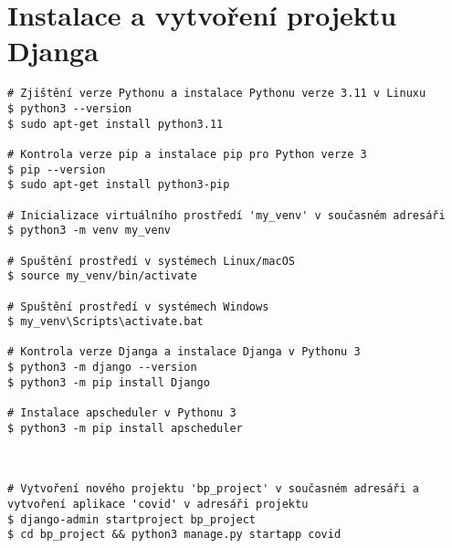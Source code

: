 \chapter{Instalace a vytvoření projektu Djanga}

\begin{lstlisting}[style=bash,label=src:DjangoInstall,caption={Instalace a vytvoření projektu Djanga \cite{django-dokumentace}}]
# Zjištění verze Pythonu a instalace Pythonu verze 3.11 v Linuxu
$ python3 --version
$ sudo apt-get install python3.11

# Kontrola verze pip a instalace pip pro Python verze 3
$ pip --version
$ sudo apt-get install python3-pip

# Inicializace virtuálního prostředí 'my_venv' v současném adresáři
$ python3 -m venv my_venv

# Spuštění prostředí v systémech Linux/macOS
$ source my_venv/bin/activate

# Spuštění prostředí v systémech Windows
$ my_venv\Scripts\activate.bat

# Kontrola verze Djanga a instalace Djanga v Pythonu 3
$ python3 -m django --version
$ python3 -m pip install Django

# Instalace apscheduler v Pythonu 3
$ python3 -m pip install apscheduler



# Vytvoření nového projektu 'bp_project' v současném adresáři a vytvoření aplikace 'covid' v adresáři projektu
$ django-admin startproject bp_project
$ cd bp_project && python3 manage.py startapp covid
\end{lstlisting}

\endinput